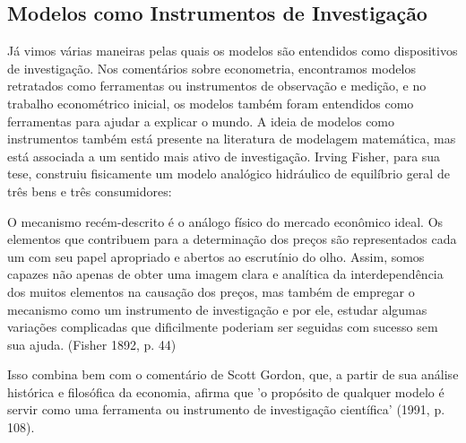 \documentclass[a4paper,12pt]{article}[abntex2]
\begin{document}
\subsection{\textbf{Modelos como Instrumentos de Investigação}}

Já vimos várias maneiras pelas quais os modelos são entendidos como dispositivos de investigação. Nos comentários sobre econometria, encontramos modelos retratados como ferramentas ou instrumentos de observação e medição, e no trabalho econométrico inicial, os modelos também foram entendidos como ferramentas para ajudar a explicar o mundo. A ideia de modelos como instrumentos também está presente na literatura de modelagem matemática, mas está associada a um sentido mais ativo de investigação. Irving Fisher, para sua tese, construiu fisicamente um modelo analógico hidráulico de equilíbrio geral de três bens e três consumidores:

O mecanismo recém-descrito é o análogo físico do mercado econômico ideal. Os elementos que contribuem para a determinação dos preços são representados cada um com seu papel apropriado e abertos ao escrutínio do olho. Assim, somos capazes não apenas de obter uma imagem clara e analítica da interdependência dos muitos elementos na causação dos preços, mas também de empregar o mecanismo como um instrumento de investigação e por ele, estudar algumas variações complicadas que dificilmente poderiam ser seguidas com sucesso sem sua ajuda. (Fisher 1892, p. 44)

Isso combina bem com o comentário de Scott Gordon, que, a partir de sua análise histórica e filosófica da economia, afirma que 'o propósito de qualquer modelo é servir como uma ferramenta ou instrumento de investigação científica' (1991, p. 108).
\end{document}
